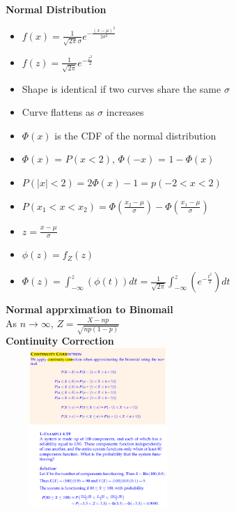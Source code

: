 \documentclass[10pt, landscape]{article}
\begin{document}
\begin{multicols}{4}
\textbf{Normal Distribution} \newline
\begin{itemize}
  \item $f(x)=\frac{1}{\sqrt{2\pi}\sigma}e^{-\frac{(x-\mu)^2}{2\sigma^2}}$
  \item $f(z) = \frac{1}{\sqrt{2\pi}}e^{-\frac{z^2}{2}}$
  \item Shape is identical if two curves share the same $\sigma$
  \item Curve flattens as $\sigma$ increases
  \item $\Phi(x)$ is the CDF of the normal distribution
  \item $\Phi(x)$ = $P(x<2)$, $\Phi(-x)$ = $1-\Phi(x)$
  \item $P(|x|<2) = 2\Phi(x)-1 = p(-2<x<2)$
  \item $P(x_1<x<x_2)=\Phi(\frac{x_2-\mu}{\sigma})-\Phi(\frac{x_1-\mu}{\sigma})$
  \item $z=\frac{x-\mu}{\sigma}$
  \item $\phi(z)=f_Z(z)$
  \item $\Phi(z)=\int_{-\infty}^{z}(\phi(t))dt=\frac{1}{\sqrt{2\pi}}\int_{-\infty}^{z}(e^{-\frac{t^2}{2}})dt$
\end{itemize}

\textbf{Normal apprximation to Binomail} \\
As $n \rightarrow \infty$, $Z = \frac{X-np}{\sqrt{np(1-p)}}$ \\ 

\textbf{Continuity Correction} \\ 
\includegraphics[width=7cm, height=6cm]{continuity.png}



\end{multicols}
\end{document}

